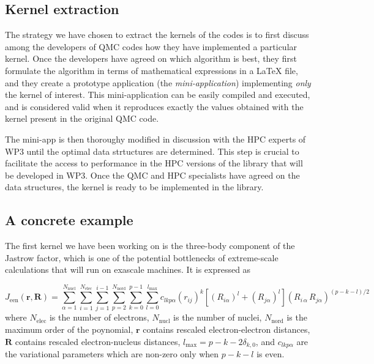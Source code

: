 \subsection{Kernel extraction}

The strategy we have chosen to extract the kernels of the codes is to
first discuss among the developers of \ac{QMC} codes how they have
implemented a particular kernel. Once the developers have agreed on
which algorithm is best, they first formulate the algorithm in terms
of mathematical expressions in a {\LaTeX} file, and they create a prototype application 
(the \emph{mini-application}) implementing \emph{only} the kernel of
interest. This mini-application can be easily compiled and executed,
and is considered valid when it reproduces exactly the values obtained
with the kernel present in the original \ac{QMC} code.

The mini-app is then thoroughy modified in discussion with the
\ac{HPC} experts of \ac{WP}3 until the optimal data strtuctures are
determined. This step is crucial to facilitate the access to performance
in the \ac{HPC} versions of the library that will be developed in \ac{WP}3.
Once the \ac{QMC} and \ac{HPC} specialists have agreed
on the data structures, the kernel is ready to be implemented in the
library.


\subsection{A concrete example}

The first kernel we have been working on is the three-body component of
the Jastrow factor, which is one of the potential bottlenecks of
extreme-scale calculations that will run on exascale machines.
It is expressed as

\newcommand{\Jeen}{J_{\text{een}}}
\newcommand{\Nel}{N_{\text{elec}}}
\newcommand{\Nat}{N_{\text{nucl}}}
\newcommand{\Nord}{N_{\text{nord}}}
\newcommand{\lmax}{l_{\text{max}}}
\newcommand{\br}{\mathbf{r}}
\newcommand{\bR}{\mathbf{R}}
\[
  \Jeen (\br,\bR) = \sum_{\alpha=1}^{\Nat} \sum_{i=1}^{\Nel} \sum_{j=1}^{i-1}
\sum_{p=2}^{\Nord} \sum_{k=0}^{p-1}
\sum_{l=0}^{\lmax} c_{lkp\alpha}
\left( {r}_{ij} \right)^k
\left[ \left( {R}_{i\alpha} \right)^l + \left( {R}_{j\alpha} \right)^l \right]
\left( {R}_{i\,\alpha} \, {R}_{j\alpha} \right)^{(p-k-l)/2} 
\]
where
$\Nel$ is the number of electrons, 
$\Nat$ is the number of nuclei,
$\Nord$ is the maximum order of the poynomial, 
$\br$ contains rescaled electron-electron distances, 
$\bR$ contains rescaled electron-nucleus distances,
$\lmax=p-k-2\delta_{k,0}$,
and $c_{lkp\alpha}$ are the variational parameters which are non-zero
only when $p-k-l$ is even.

